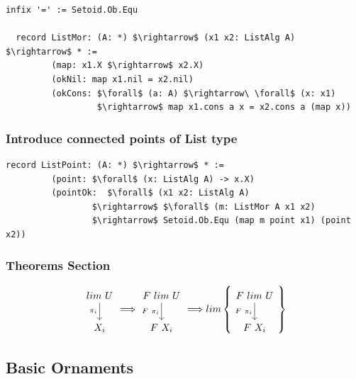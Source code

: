 \documentclass[11pt,oneside]{article}
\begin{document}
\begin{lstlisting}[mathescape=true]
  infix '=' := Setoid.Ob.Equ

  record ListMor: (A: *) $\rightarrow$ (x1 x2: ListAlg A) $\rightarrow$ * :=
         (map: x1.X $\rightarrow$ x2.X)
         (okNil: map x1.nil = x2.nil)
         (okCons: $\forall$ (a: A) $\rightarrow\ \forall$ (x: x1)
                  $\rightarrow$ map x1.cons a x = x2.cons a (map x))
\end{lstlisting}

\subsubsection*{Introduce connected points of List type}

\begin{lstlisting}[mathescape=true]
  record ListPoint: (A: *) $\rightarrow$ * :=
         (point: $\forall$ (x: ListAlg A) -> x.X)
         (pointOk:  $\forall$ (x1 x2: ListAlg A)
                 $\rightarrow$ $\forall$ (m: ListMor A x1 x2)
                 $\rightarrow$ Setoid.Ob.Equ (map m point x1) (point x2))
\end{lstlisting}

\subsubsection*{Theorems Section}

\begin{center}
$$
\begin{tikzcd}
  lim\ U \arrow{d}[left]{\pi_i} \\
  X_i 
\end{tikzcd}
\Longrightarrow
\begin{tikzcd}
  F\ lim\ U \arrow{d}[left]{F\ \pi_i} \\
  F\ X_i 
\end{tikzcd}
\Longrightarrow
lim\left\{
\begin{tikzcd}
  F\ lim\ U \arrow{d}[left]{F\ \pi_i} \\
  F\ X_i 
\end{tikzcd}
\right\}
$$
\end{center}

\subsection{Basic Ornaments}
\end{document}
